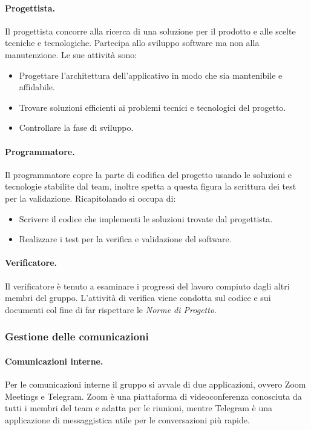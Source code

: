\paragraph{Progettista.}
Il progettista concorre alla ricerca di una soluzione per il prodotto e alle scelte tecniche e tecnologiche.
Partecipa allo sviluppo software ma non alla manutenzione. Le sue attività sono:
\begin{itemize}
    \item Progettare l'architettura dell'applicativo in modo che sia mantenibile e affidabile.
    \item Trovare soluzioni efficienti ai problemi tecnici e tecnologici del progetto.
    \item Controllare la fase di sviluppo.
\end{itemize}

\paragraph{Programmatore.}
Il programmatore copre la parte di codifica del progetto usando le soluzioni e tecnologie stabilite dal team, inoltre
spetta a questa figura la scrittura dei test per la validazione. Ricapitolando si occupa di:
\begin{itemize}
    \item Scrivere il codice che implementi le soluzioni trovate dal progettista.
    \item Realizzare i test per la verifica e validazione del software.
\end{itemize}

\paragraph{Verificatore.}
Il verificatore è tenuto a esaminare i progressi del lavoro compiuto dagli altri membri del gruppo.   
L'attività di verifica viene condotta sul codice e sui documenti col fine di far rispettare le \emph{Norme di Progetto}.

\subsubsection{Gestione delle comunicazioni}
\paragraph{Comunicazioni interne.}
Per le comunicazioni interne il gruppo si avvale di due applicazioni, ovvero Zoom Meetings e Telegram.
Zoom è una piattaforma di videoconferenza conosciuta da tutti i membri del team e adatta per le riunioni, mentre Telegram
è una applicazione di messaggistica utile per le conversazioni più rapide.


